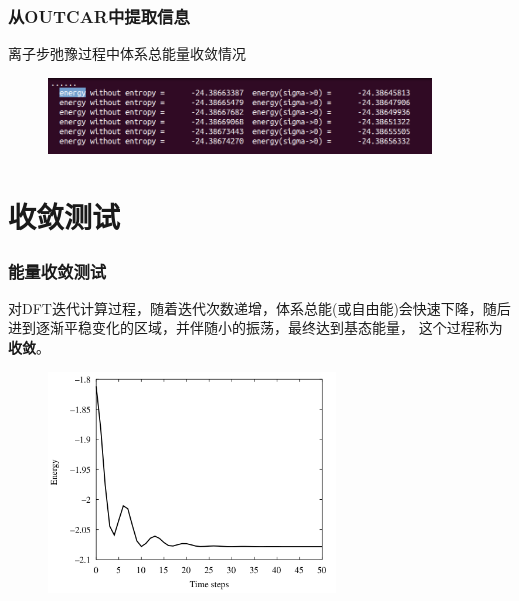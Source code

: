{
	\frametitle{从\textrm{OUTCAR}中提取信息}
	离子步弛豫过程中体系总能量收敛情况%
\begin{figure}[h!]
\centering
\includegraphics[width=4.0in,viewport=0 0 680 130,clip]{Figures/Pt_FCC-OUTCAR_totene.png}
\caption{\fontsize{6.2pt}{5.2pt}}%
\label{Pt_FCC:OUTCAR_totene}
\end{figure}
{\fontsize{7.2pt}{5.2pt}}
}
\section{收敛测试}\label{Sec:convergence}
\frame
{
	\frametitle{能量收敛测试}
对\textrm{DFT}迭代计算过程，随着迭代次数递增，体系总能(或自由能)会快速下降，随后进到逐渐平稳变化的区域，并伴随小的振荡，最终达到基态能量，%
这个过程称为\textbf{收敛}。
\begin{figure}[h!]
	\vskip -5pt
\centering
\includegraphics[width=3.0in,viewport=0 33 740 600,clip]{Figures/Ab-initio-Ene.png}
\caption{\fontsize{6.2pt}{5.2pt}}%
\label{Fig:convergence}
\end{figure}
{\fontsize{7.0pt}{5.2pt}}
}

